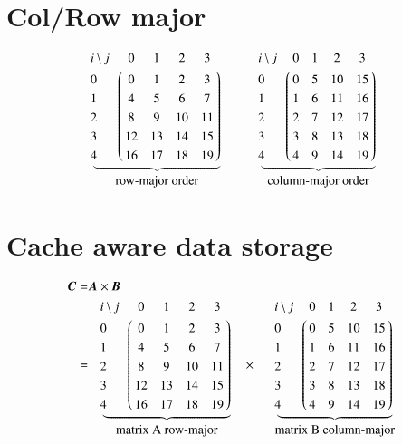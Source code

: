 \documentclass[10pt,a4paper]{article}%
\begin{document}
\section{Col/Row major}
\begin{align*}
\underbrace{\bordermatrix{
		i\ \text{\textbackslash} \ j
		& 0 &  1 & 2 & 3      \cr
		0 & 0  & 1  & 2  & 3  \cr
		1 & 4  & 5  & 6  & 7  \cr
		2 & 8  & 9  & 10 & 11 \cr
		3 & 12 & 13 & 14 & 15 \cr
		4 & 16 & 17 & 18 & 19 \cr
}}_{\textstyle\begin{array}{c}\text{row-major order}
\end{array}}
\qquad\quad
\underbrace{\bordermatrix{
		i\ \text{\textbackslash} \ j
		& 0 & 1 & 2 & 3     \cr
		0 & 0 & 5 & 10 & 15 \cr
		1 & 1 & 6 & 11 & 16 \cr
		2 & 2 & 7 & 12 & 17 \cr
		3 & 3 & 8 & 13 & 18 \cr
		4 & 4 & 9 & 14 & 19 \cr
}}_{\textstyle\begin{array}{c}\text{column-major order}
	\end{array}}
\end{align*}

\section{Cache aware data storage}
\begin{align*}
\boldsymbol{C}= &\boldsymbol{A} \times  \boldsymbol{B} \\
= & \quad\underbrace{\bordermatrix{
		i\ \text{\textbackslash} \ j
		& 0 &  1 & 2 & 3      \cr
		0 & 0  & 1  & 2  & 3  \cr
		1 & 4  & 5  & 6  & 7  \cr
		2 & 8  & 9  & 10 & 11 \cr
		3 & 12 & 13 & 14 & 15 \cr
		4 & 16 & 17 & 18 & 19 \cr
}}_{\textstyle\begin{array}{c}\text{matrix A row-major}
	\end{array}}
\quad \times\quad
\underbrace{\bordermatrix{
		i\ \text{\textbackslash} \ j
		& 0 & 1 & 2 & 3     \cr
		0 & 0 & 5 & 10 & 15 \cr
		1 & 1 & 6 & 11 & 16 \cr
		2 & 2 & 7 & 12 & 17 \cr
		3 & 3 & 8 & 13 & 18 \cr
		4 & 4 & 9 & 14 & 19 \cr
}}_{\textstyle\begin{array}{c}\text{matrix B column-major}
	\end{array}}
\end{align*}
\end{document}
